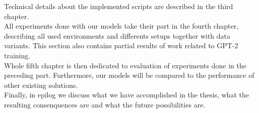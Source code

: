 Technical details about the implemented scripts are described in the third chapter.\\

All experiments done with our models take their part in the fourth chapter, describing all used environments and differents setups together with data variants. This section also contains partial results of work related to GPT-2 training.\\

Whole fifth chapter is then dedicated to evaluation of experiments done in the preceding part. Furthermore, our models will be compared to the performance of other existing solutions.\\

Finally, in epilog we discuss what we have accomplished in the thesis, what the resulting consenquences are and what the future possibilities are.